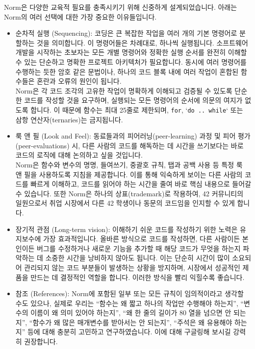 \documentclass{42-ko}
\begin{document}
    Norm은 다양한 교육적 필요를 충족시키기 위해 신중하게 설계되었습니다.
    아래는 Norm의 여러 선택에 대한 가장 중요한 이유들입니다.
    \begin{itemize}

    \item 순차적 실행 (Sequencing): 코딩은 큰 복잡한 작업을 여러 개의 기본
      명령어로 분할하는 것을 의미합니다. 이 명령어들은 차례대로, 하나씩
      실행됩니다. 소프트웨어 개발을 시작하는 초보자는 모든 개별 명령어와 정확한
      실행 순서를 완전히 이해할 수 있는 단순하고 명확한 프로젝트 아키텍처가
      필요합니다. 동시에 여러 명령어를 수행하는 듯한 암호 같은 문법이나, 하나의
      코드 블록 내에 여러 작업이 혼합된 함수들은 혼란과 오류의 원인이 됩니다.\\
      Norm은 각 코드 조각의 고유한 작업이 명확하게 이해되고 검증될 수 있도록
      단순한 코드를 작성할 것을 요구하며, 실행되는 모든 명령어의 순서에
      의문의 여지가 없도록 합니다. 이 때문에 함수는 최대 25줄로 제한되며,
      \texttt{for}, `\texttt{do .. while}` 또는 삼항 연산자(ternaries)는
      금지됩니다.

    \item 룩 앤 필 (Look and Feel): 동료들과의 피어러닝(peer-learning) 과정 및
      피어 평가(peer-evaluations) 시, 다른 사람의 코드를 해독하는 데 시간을
      쓰기보다는 바로 코드의 로직에 대해 논의하고 싶을 것입니다.\\
      Norm은 함수와 변수의 명명, 들여쓰기, 중괄호 규칙, 탭과 공백 사용 등 특정
      룩 앤 필을 사용하도록 지침을 제공합니다. 이를 통해 익숙하게 보이는 다른
      사람의 코드를 빠르게 이해하고, 코드를 읽어야 하는 시간을 줄여 바로 핵심
      내용으로 들어갈 수 있습니다. 또한 Norm은 하나의 상표(trademark)로
      작용하여, 42 커뮤니티의 일원으로서 취업 시장에서 다른 42 학생이나 동문의
      코드임을 인지할 수 있게 합니다.

    \item 장기적 관점 (Long-term vision): 이해하기 쉬운 코드를 작성하기 위한
      노력은 유지보수에 가장 효과적입니다. 올바른 방식으로 코드를 작성하면,
      다른 사람이든 본인이든 버그를 수정하거나 새로운 기능을 추가할 때 해당
      코드가 무엇을 하는지 파악하는 데 소중한 시간을 낭비하지 않아도 됩니다.
      이는 단순히 시간이 많이 소요되어 관리되지 않는 코드 부분들이 발생하는
      상황을 방지하며, 시장에서 성공적인 제품을 만드는 데 결정적인 역할을
      합니다. 이러한 방식을 빨리 익힐수록 좋습니다.

    \item 참조 (References): Norm에 포함된 일부 또는 모든 규칙이 임의적이라고
    생각할 수도 있으나, 실제로 우리는 “함수는 왜 짧고 하나의 작업만 수행해야
    하는지”, “변수의 이름이 왜 의미 있어야 하는지”, “왜 한 줄의 길이가 80
    열을 넘으면 안 되는지”, “함수가 왜 많은 매개변수를 받아서는 안 되는지”,
    “주석은 왜 유용해야 하는지” 등에 대해 충분히 고민하고 연구하였습니다.
    이에 대해 구글링해 보시길 강력히 권장합니다.

    \end{itemize}
\end{document}
